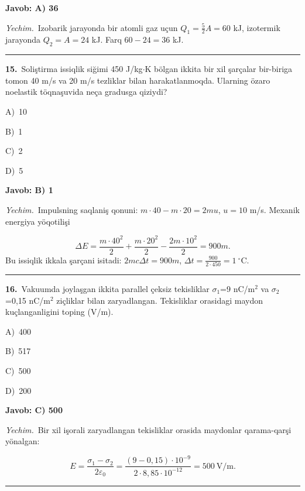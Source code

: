 \documentclass[11pt,a4paper]{article}
\newcommand{\opt}[2]{\hspace*{4mm}#1)\ #2\par}
\begin{document}
\noindent\colorbox{gray!12}{\parbox{\dimexpr\linewidth-2\fboxsep}{\textbf{Javob: A) 36}}}\par\smallskip
\noindent\textit{Yechim.}\ Izobarik jarayonda bir atomli gaz uçun $Q_1=\frac52A=60$ kJ, izotermik jarayonda $Q_2=A=24$ kJ. Farq $60-24=36$ kJ.\par\par\medskip\hrule\medskip
{}\noindent\begin{minipage}{\linewidth}
\textbf{15.}\ Soliştirma issiqlik siğimi 450 J/kg$\cdot$K bölgan ikkita bir xil şarçalar bir-biriga tomon 40 m/s va 20 m/s tezliklar bilan harakatlanmoqda. Ularning özaro noelastik töqnaşuvida neça gradusga qiziydi?\par\smallskip
\opt{A}{10}
\opt{B}{1}
\opt{C}{2}
\opt{D}{5}
\end{minipage}\vspace{2pt}\par
\noindent\colorbox{gray!12}{\parbox{\dimexpr\linewidth-2\fboxsep}{\textbf{Javob: B) 1}}}\par\smallskip
\noindent\textit{Yechim.}\ Impulsning saqlaniş qonuni: $m\cdot40-m\cdot20=2mu$, $u=10$ m/s. Mexanik energiya yöqotilişi\par
\[\Delta E=\frac{m\cdot40^2}{2}+\frac{m\cdot20^2}{2}-\frac{2m\cdot10^2}{2}=900m.\]
Bu issiqlik ikkala şarçani isitadi: $2mc\Delta t=900m$, $\Delta t=\frac{900}{2\cdot450}=1\ ^\circ$C.\par\par\medskip\hrule\medskip
{}\noindent\begin{minipage}{\linewidth}
\textbf{16.}\ Vakuumda joylaşgan ikkita parallel çeksiz tekisliklar $\sigma_1$=9 nC/m$^{2}$ va $\sigma_2$=0,15 nC/m$^{2}$ ziçliklar bilan zaryadlangan. Tekisliklar orasidagi maydon kuçlanganligini toping (V/m).\par\smallskip
\opt{A}{400}
\opt{B}{517}
\opt{C}{500}
\opt{D}{200}
\end{minipage}\vspace{2pt}\par
\noindent\colorbox{gray!12}{\parbox{\dimexpr\linewidth-2\fboxsep}{\textbf{Javob: C) 500}}}\par\smallskip
\noindent\textit{Yechim.}\ Bir xil işorali zaryadlangan tekisliklar orasida maydonlar qarama-qarşi yönalgan:\par
\[E=\frac{\sigma_1-\sigma_2}{2\varepsilon_0}=\frac{(9-0{,}15)\cdot10^{-9}}{2\cdot8{,}85\cdot10^{-12}}=500\ \text{V/m}.\]\par\medskip\hrule\medskip
\end{document}
